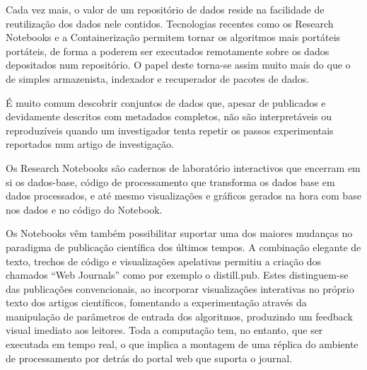 \documentclass[sigconf,nonacm]{acmart}
\begin{document}
Cada vez mais, o valor de um repositório de dados reside na facilidade de reutilização dos dados nele contidos. Tecnologias recentes como os Research Notebooks e a Containerização permitem tornar os algoritmos mais portáteis portáteis, de forma a poderem ser executados remotamente sobre os dados depositados num repositório. O papel deste torna-se assim muito mais do que o de simples armazenista, indexador e recuperador de pacotes de dados.

É muito comum descobrir conjuntos de dados que, apesar de publicados e devidamente descritos com metadados completos, não são interpretáveis ou reproduzíveis quando um investigador tenta repetir os passos experimentais reportados num artigo de investigação\cite{}. 

Os Research Notebooks são cadernos de laboratório interactivos que encerram em si os dados-base, código de processamento que transforma os dados base em dados processados, e até mesmo visualizações e gráficos gerados na hora com base nos dados e no código do Notebook.

Os Notebooks vêm também possibilitar suportar uma dos maiores mudanças no paradigma de publicação científica dos últimos tempos. A combinação elegante de texto, trechos de código e visualizações apelativas permitiu a criação dos chamados ``Web Journals'' como por exemplo o distill.pub. Estes distinguem-se das publicações convencionais, ao incorporar visualizações interativas no próprio texto dos artigos científicos, fomentando a experimentação através da manipulação de parâmetros de entrada dos algoritmos, produzindo um feedback visual imediato aos leitores. Toda a computação tem, no entanto, que ser executada em tempo real, o que implica a montagem de uma réplica do ambiente de processamento por detrás do portal web que suporta o journal.
\end{document}
